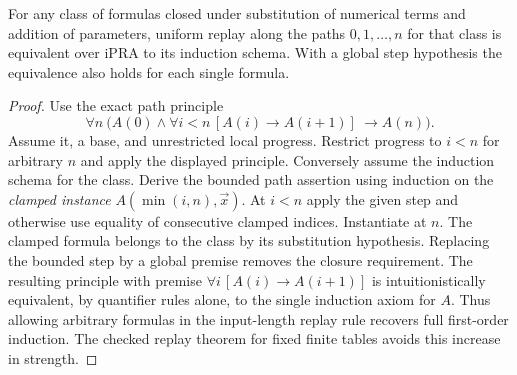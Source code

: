 \begin{prop}\label{p:path}
For any class of formulas closed under substitution of numerical terms and addition of parameters, uniform replay along the paths $0,1,\ldots,n$ for that class is equivalent over iPRA to its induction schema. With a global step hypothesis the equivalence also holds for each single formula.
\end{prop}
\begin{proof}
Use the exact path principle
\[
 \forall n\ \bigl(A(0)\land \forall i<n\,[A(i)\to A(i+1)]
                  \ \longrightarrow A(n)\bigr).
\]
Assume it, a base, and unrestricted local progress. Restrict progress to $i<n$ for arbitrary $n$ and apply the displayed principle. Conversely assume the induction schema for the class. Derive the bounded path assertion using induction on the \emph{clamped instance} $A(\min(i,n),\vec x)$. At $i<n$ apply the given step and otherwise use equality of consecutive clamped indices. Instantiate at $n$. The clamped formula belongs to the class by its substitution hypothesis. Replacing the bounded step by a global premise removes the closure requirement. The resulting principle with premise $\forall i\,[A(i)\to A(i+1)]$ is intuitionistically equivalent, by quantifier rules alone, to the single induction axiom for $A$. Thus allowing arbitrary formulas in the input-length replay rule recovers full first-order induction. The checked replay theorem for fixed finite tables avoids this increase in strength.
\end{proof}

